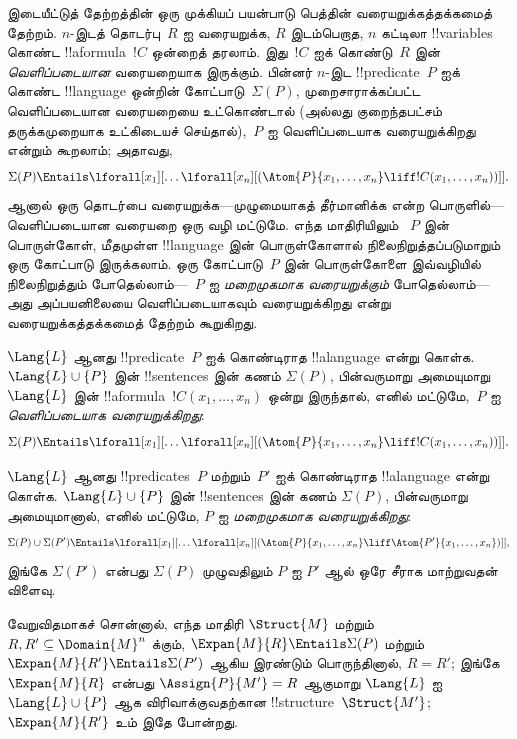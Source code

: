\documentclass[../../../include/open-logic-section]{subfiles}
\begin{document}



இடையீட்டுத் தேற்றத்தின் ஒரு முக்கியப் பயன்பாடு பெத்தின்
வரையறுக்கத்தக்கமைத் தேற்றம். $n$-இடத் தொடர்பு~$R$ ஐ வரையறுக்க,
$R$ இடம்பெறாத, $n$ கட்டிலா !!{variable}s கொண்ட !!a{formula}~$!C$
ஒன்றைத் தரலாம். இது~$!C$ ஐக் கொண்டு~$R$ இன் \emph{வெளிப்படையான}
வரையறையாக இருக்கும். பின்னர் $n$-இட !!{predicate}~$P$ ஐக் கொண்ட
!!{language} ஒன்றின் கோட்பாடு~$\Sigma(P)$, முறைசாராக்கப்பட்ட
வெளிப்படையான வரையறையை உட்கொண்டால் (அல்லது குறைந்தபட்சம் தருக்கமுறையாக
உட்கிடையச் செய்தால்),~$P$ ஐ வெளிப்படையாக வரையறுக்கிறது என்றும்
கூறலாம்; அதாவது,
\[
\Sigma(P) \Entails \lforall[x_1][\dots
  \lforall[x_n][(\Atom{P}{x_1,\dots, x_n} \liff !C(x_1, \dots,
    x_n))]].
\]
ஆனால் ஒரு தொடர்பை வரையறுக்க---முழுமையாகத் தீர்மானிக்க என்ற
பொருளில்---வெளிப்படையான வரையறை ஒரு வழி மட்டுமே. எந்த மாதிரியிலும்
~$P$ இன் பொருள்கோள், மீதமுள்ள !!{language} இன் பொருள்கோளால்
நிலைநிறுத்தப்படுமாறும் ஒரு கோட்பாடு இருக்கலாம். ஒரு கோட்பாடு~$P$ இன்
பொருள்கோளை இவ்வழியில் நிலைநிறுத்தும் போதெல்லாம்---~$P$ ஐ
\emph{மறைமுகமாக வரையறுக்கும்} போதெல்லாம்---அது அப்பயனிலையை வெளிப்படையாகவும்
வரையறுக்கிறது என்று வரையறுக்கத்தக்கமைத் தேற்றம் கூறுகிறது.

\begin{defn}
$\Lang{L}$ ஆனது !!{predicate}~$P$ ஐக் கொண்டிராத !!a{language}
என்று கொள்க. $\Lang{L}
\cup \{P\}$ இன் !!{sentence}s இன் கணம் $\Sigma(P)$, பின்வருமாறு
அமையுமாறு $\Lang{L}$ இன் !!a{formula}~$!C(x_1, \dots, x_n)$ ஒன்று
இருந்தால், எனில் மட்டுமே,~$P$ ஐ \emph{வெளிப்படையாக வரையறுக்கிறது}:
\[
\Sigma(P) \Entails \lforall[x_1][\dots
  \lforall[x_n][(\Atom{P}{x_1,\dots, x_n} \liff !C(x_1, \dots,
    x_n))]].
\]
\end{defn}

\begin{defn}
$\Lang{L}$ ஆனது !!{predicate}s~$P$ மற்றும்~$P'$ ஐக் கொண்டிராத
!!a{language} என்று கொள்க. $\Lang{L} \cup \{P\}$ இன்
!!{sentence}s இன் கணம் $\Sigma(P)$, பின்வருமாறு அமையுமானால், எனில்
மட்டுமே, $P$ ஐ \emph{மறைமுகமாக வரையறுக்கிறது}:
\[
\Sigma(P) \cup \Sigma(P') \Entails \lforall[x_1][\dots
  \lforall[x_n][(\Atom{P}{x_1,\dots, x_n} \liff \Atom{P'}{x_1,\dots,
      x_n})]],
\]
இங்கே $\Sigma(P')$ என்பது $\Sigma(P)$ முழுவதிலும் $P$ ஐ $P'$ ஆல்
ஒரே சீராக மாற்றுவதன் விளைவு.
\end{defn}

வேறுவிதமாகச் சொன்னால், எந்த மாதிரி $\Struct{M}$ மற்றும்
$R, R' \subseteq
\Domain{M}^n$ க்கும், $\Expan{M}{R} \Entails \Sigma(P)$ மற்றும்
$\Expan{M}{R'} \Entails \Sigma(P')$ ஆகிய இரண்டும் பொருந்தினால்,
$R=R'$; இங்கே $\Expan{M}{R}$ என்பது
$\Assign{P}{M'} = R$ ஆகுமாறு $\Lang{L}$ ஐ
$\Lang{L} \cup \{P\}$ ஆக விரிவாக்குவதற்கான
!!{structure}~$\Struct{M'}$; $\Expan{M}{R'}$ உம் இதே போன்றது.
\end{document}
